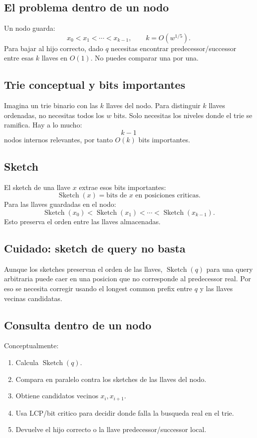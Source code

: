 \documentclass[10pt]{article}
\newcommand{\bigO}{O}
\newcommand{\Sketch}{\operatorname{Sketch}}
\begin{document}
\subsection{El problema dentro de un nodo}
Un nodo guarda:
\[
x_0<x_1<\cdots<x_{k-1},\qquad k=\bigO(w^{1/5}).
\]
Para bajar al hijo correcto, dado $q$ necesitas encontrar predecessor/successor
entre esas $k$ llaves en $\bigO(1)$. No puedes comparar una por una.

\subsection{Trie conceptual y bits importantes}
Imagina un trie binario con las $k$ llaves del nodo. Para distinguir $k$ llaves
ordenadas, no necesitas todos los $w$ bits. Solo necesitas los niveles donde el
trie se ramifica. Hay a lo mucho:
\[
k-1
\]
nodos internos relevantes, por tanto $\bigO(k)$ bits importantes.

\subsection{Sketch}
El sketch de una llave $x$ extrae esos bits importantes:
\[
\Sketch(x)=\text{bits de }x\text{ en posiciones criticas}.
\]
Para las llaves guardadas en el nodo:
\[
\Sketch(x_0)<\Sketch(x_1)<\cdots<\Sketch(x_{k-1}).
\]
Esto preserva el orden entre las llaves almacenadas.

\subsection{Cuidado: sketch de query no basta}
Aunque los sketches preservan el orden de las llaves, $\Sketch(q)$ para una
query arbitraria puede caer en una posicion que no corresponde al predecessor
real. Por eso se necesita corregir usando el longest common prefix entre $q$ y
las llaves vecinas candidatas.

\subsection{Consulta dentro de un nodo}
Conceptualmente:
\begin{enumerate}[leftmargin=*]
\item Calcula $\Sketch(q)$.
\item Compara en paralelo contra los sketches de las llaves del nodo.
\item Obtiene candidatos vecinos $x_i,x_{i+1}$.
\item Usa LCP/bit critico para decidir donde falla la busqueda real en el trie.
\item Devuelve el hijo correcto o la llave predecessor/successor local.
\end{enumerate}
\end{document}
